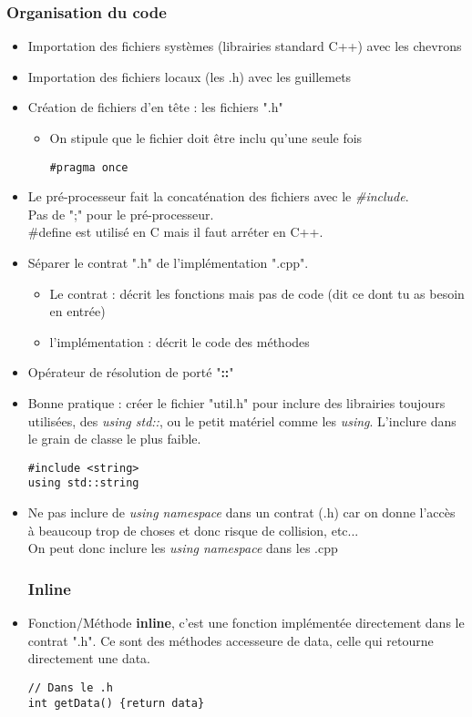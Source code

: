 \documentclass[12pt,a4paper]{article}
\begin{document}
\subsubsection{Organisation du code}
\begin{itemize}
\item Importation des fichiers systèmes (librairies standard C++) avec les chevrons
\item Importation des fichiers locaux (les .h) avec les guillemets
\item Création de fichiers d'en tête : les fichiers ".h"
\begin{itemize}
\item On stipule que le fichier doit être inclu qu'une seule fois
\begin{lstlisting}
#pragma once
\end{lstlisting}
\end{itemize}
\item Le pré-processeur fait la concaténation des fichiers avec le \textit{\#include}.\\
Pas de ";" pour le pré-processeur.\\
\#define est utilisé en C mais il faut arréter en C++.
\item Séparer le contrat ".h" de l'implémentation ".cpp".
\begin{itemize}
\item Le contrat : décrit les fonctions mais pas de code (dit ce dont tu as besoin en entrée)
\item l'implémentation : décrit le code des méthodes
\end{itemize}
\item Opérateur de résolution de porté "\textbf{::}"
\item Bonne pratique : créer le fichier "util.h" pour inclure des librairies toujours utilisées, des \textit{using std::}, ou le petit matériel comme les \textit{using}. L'inclure dans le grain de classe le plus faible.
\begin{lstlisting}
#include <string>
using std::string
\end{lstlisting}
\item Ne pas inclure de \textit{using namespace} dans un contrat (.h) car on donne l'accès à beaucoup trop de choses et donc risque de collision, etc...\\
On peut donc inclure les \textit{using namespace} dans les .cpp
\subsubsection{Inline}
\item Fonction/Méthode \textbf{inline}, c'est une fonction implémentée directement dans le contrat ".h". Ce sont des méthodes accesseure de data, celle qui retourne directement une data.
\begin{lstlisting}
// Dans le .h
int getData() {return data}


\end{lstlisting}
\end{itemize}
\end{document}
